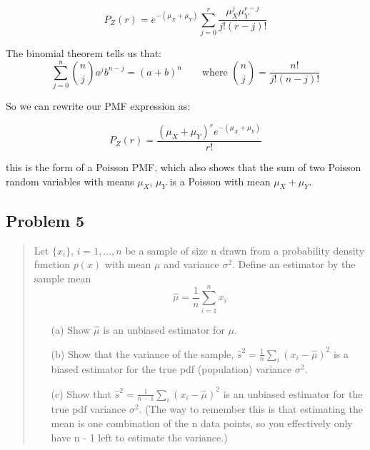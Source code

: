 \documentclass[10pt]{article}
\begin{document}
\begin{enumerate}[label=(\alph*)]
	      \[ P_Z(r) = e^{-(\mu_X + \mu_Y)} \sum_{j=0}^{r} \frac{\mu_X^j \mu_Y^{r - j}}{j! (r - j)!} \]

	      The binomial theorem tells us that:
	      \[ \sum_{j=0}^{n} \binom{n}{j} a^j b^{n-j} = (a+b)^n  \qquad \text{where } \binom{n}{j} = \frac{n!}{j! (n-j)!} \]

	      So we can rewrite our PMF expression as:

	      \[ \boxed{P_Z(r) = \frac{(\mu_X + \mu_Y)^r  e^{-(\mu_X + \mu_Y)}}{r!}} \]

	      this is the form of a Poisson PMF, which also shows that the sum of two Poisson random variables with means $\mu_{X}$, $\mu_{Y}$ is a Poisson with mean $\mu_{X}+\mu_{Y}$.

\end{enumerate}

\subsection*{Problem 5}
\begin{quote}
	Let $\{x_{i}\}$, $i=1, ..., n$ be a sample of size n drawn from a probability density function $p(x)$ with mean $\mu$ and variance $\sigma^{2}$. Define an estimator by the sample mean
	$$ \hat{\mu}=\frac{1}{n}\sum_{i=1}^{n}x_{i} $$
	\begin{enumerate}
		\item[(a)] Show $\hat{\mu}$ is an unbiased estimator for $\mu$.
		\item[(b)] Show that the variance of the sample, $\hat{s}^{2}=\frac{1}{n}\sum_{i}(x_{i}-\hat{\mu})^{2}$ is a biased estimator for the true pdf (population) variance $\sigma^{2}$.
		\item[(c)] Show that $\hat{s}^{2}=\frac{1}{n-1}\sum_{i}(x_{i}-\hat{\mu})^{2}$ is an unbiased estimator for the true pdf variance $\sigma^{2}$.
		      (The way to remember this is that estimating the mean is one combination of the n data points, so you effectively only have n - 1 left to estimate the variance.)
	\end{enumerate}
\end{quote}

\divider
\end{document}
